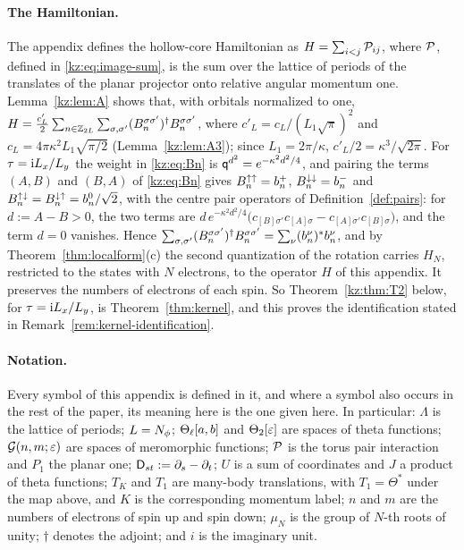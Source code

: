 \paragraph{The Hamiltonian.} The appendix defines the hollow-core Hamiltonian as $H=\sum_{i<j}\mathcal{P}_{ij}$, where
$\mathcal{P}$, defined in \eqref{kz:eq:image-sum}, is the sum over the lattice of periods of the translates of the planar
projector onto relative angular momentum one. Lemma~\ref{kz:lem:A} shows that, with orbitals normalized to one,
$H=\frac{c'_L}2\sum_{n\in\mathbb{Z}_{2L}}\sum_{\sigma,\sigma'}(B_n^{\sigma\sigma'})^\dagger B_n^{\sigma\sigma'}$, where $c'_L=c_L/(L_1\sqrt\pi)^2$ and
$c_L=4\pi\kappa^2L_1\sqrt{\pi/2}$ (Lemma~\ref{kz:lem:A3}); since $L_1=2\pi/\kappa$, $c'_L/2=\kappa^3/\sqrt{2\pi}$. For
$\tau=\mathrm{i} L_x/L_y$ the weight in \eqref{kz:eq:Bn} is $\mathsf{q}^{d^2}=e^{-\kappa^2d^2/4}$, and pairing the terms $(A,B)$ and $(B,A)$
of \eqref{kz:eq:Bn} gives $B_n^{{\uparrow}{\uparrow}}=b^{+}_{n}$, $B_n^{{\downarrow}{\downarrow}}=b^{-}_{n}$ and $B_n^{{\uparrow}{\downarrow}}=B_n^{{\downarrow}{\uparrow}}=b^{0}_{n}/\sqrt2$, with
the centre pair operators of Definition~\ref{def:pairs}: for $d:=A-B>0$, the two terms are
$d\,e^{-\kappa^2d^2/4}\bigl(c_{[B]\sigma'}c_{[A]\sigma}-c_{[A]\sigma'}c_{[B]\sigma}\bigr)$, and the term $d=0$ vanishes. Hence
$\sum_{\sigma,\sigma'}(B_n^{\sigma\sigma'})^\dagger B_n^{\sigma\sigma'}=\sum_\nu(b^{\nu}_{n})^*b^{\nu}_{n}$, and by
Theorem~\ref{thm:localform}(c) the second quantization of the rotation carries $H_N$, restricted to the states with $N$
electrons, to the operator $H$ of this appendix. It preserves the numbers of electrons of each spin. So
Theorem~\ref{kz:thm:T2} below, for $\tau=\mathrm{i} L_x/L_y$, is Theorem~\ref{thm:kernel}, and this proves the identification stated in
Remark~\ref{rem:kernel-identification}.

\paragraph{Notation.} Every symbol of this appendix is defined in it, and where a symbol also occurs in the rest of
the paper, its meaning here is the one given here. In particular: $\Lambda$ is the lattice of periods; $L=N_{\phi}$;
$\Theta_\ell[a,b]$ and $\Theta_2[\varepsilon]$ are spaces of theta functions; $\mathcal{G}(n,m;\varepsilon)$ are spaces of meromorphic
functions; $\mathcal{P}$ is the torus pair interaction and $P_1$ the planar one; $\mathsf{D}_{st}:=\partial_s-\partial_t$; $U$ is a sum of
coordinates and $J$ a product of theta functions; $T_K$ and $T_1$ are many-body translations, with $T_1=\Theta^*$ under the
map above, and $K$ is the corresponding momentum label; $n$ and $m$ are the numbers of electrons of spin up and spin
down; $\mu_N$ is the group of $N$-th roots of unity; $\dagger$ denotes the adjoint; and $i$ is the imaginary unit.

